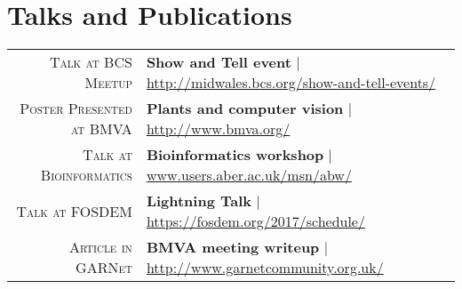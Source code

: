 \documentclass[a4paper,10pt]{article}
\begin{document}
\section{Talks and Publications}
\begin{tabular}{rl}	
  \textsc{Talk at BCS Meetup} & \textbf{Show and Tell event} | \href{http://www.midwales.bcs.org/show-and-tell-events/}{http://midwales.bcs.org/show-and-tell-events/}\\
  \textsc{Poster Presented at BMVA} & \textbf{Plants and computer vision} | \href{http://www.bmva.org/}{http://www.bmva.org/}\\
  \textsc{Talk at Bioinformatics} & \textbf{Bioinformatics workshop} | \href{www.users.aber.ac.uk/msn/abw/index.html}{www.users.aber.ac.uk/msn/abw/} \\
  \textsc{Talk at FOSDEM} & \textbf{Lightning Talk} | \href{https://fosdem.org/2017/schedule/}{https://fosdem.org/2017/schedule/}\\
  \textsc{Article in GARNet} & \textbf{BMVA meeting writeup} | \href{http://www.garnetcommunity.org.uk}{http://www.garnetcommunity.org.uk/}
                         
\end{tabular}



\end{document}
